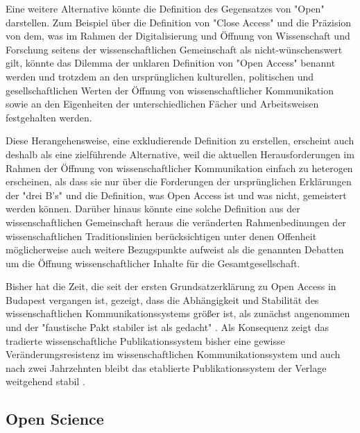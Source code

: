 Eine weitere Alternative könnte die Definition des Gegensatzes von "Open" darstellen. Zum Beispiel über die Definition von "Close Access" und die Präzision von dem, was im Rahmen der Digitalisierung und Öffnung von Wissenschaft und Forschung seitens der wissenschaftlichen Gemeinschaft als nicht-wünschenswert gilt, könnte das Dilemma der unklaren Definition von "Open Access" benannt werden und trotzdem an den ursprünglichen kulturellen, politischen und gesellschaftlichen Werten der Öffnung von wissenschaftlicher Kommunikation sowie an den Eigenheiten der unterschiedlichen Fächer und Arbeitsweisen festgehalten werden.

Diese Herangehensweise, eine exkludierende Definition zu erstellen, erscheint auch deshalb als eine zielführende Alternative, weil die aktuellen Herausforderungen im Rahmen der Öffnung von wissenschaftlicher Kommunikation einfach zu heterogen erscheinen, als dass sie nur über die Forderungen der ursprünglichen Erklärungen der "drei B's" und die Definition, was Open Access ist und was nicht, gemeistert werden können. Darüber hinaus könnte eine solche Definition aus der wissenschaftlichen Gemeinschaft heraus die veränderten Rahmenbedinungen der wissenschaftlichen Traditionslinien berücksichtigen unter denen Offenheit möglicherweise auch weitere Bezugspunkte aufweist als die genannten Debatten um die Öffnung wissenschaftlicher Inhalte für die Gesamtgesellschaft.

Bisher hat die Zeit, die seit der ersten Grundsatzerklärung zu Open Access in Budapest vergangen ist, gezeigt, dass die Abhängigkeit und Stabilität des wissenschaftlichen Kommunikationssystems größer ist, als zunächst angenommen und der "faustische Pakt stabiler ist als gedacht" \cite{Hagner_2015}. Als Konsequenz zeigt das tradierte wissenschaftliche Publikationssystem bisher eine gewisse Veränderungsresistenz im wissenschaftlichen Kommunikationssystem und auch nach zwei Jahrzehnten bleibt das etablierte Publikationssystem der Verlage weitgehend stabil \cite{Hanekop_2014}.

\subsection{Open Science}

